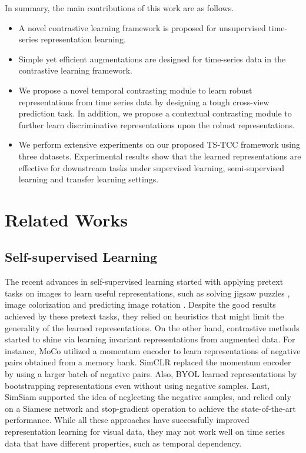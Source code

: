 \documentclass{article}
\begin{document}
In summary, the main contributions of this work are as follows.
\begin{itemize}
    \item A novel contrastive learning framework is proposed for unsupervised time-series representation learning. 
    
     \item Simple yet efficient augmentations are designed for time-series data in the contrastive learning framework. 
    
    \item We propose a novel temporal contrasting module to learn robust representations from time series data by designing a tough cross-view prediction task.  
    In addition, we propose a contextual contrasting module to further learn discriminative representations upon the robust representations.
    
    \item We perform extensive experiments on our proposed TS-TCC framework using three datasets. Experimental results show that the learned representations are effective for downstream tasks under supervised learning, semi-supervised learning and transfer learning settings.

\end{itemize}


\section{Related Works}

\subsection{Self-supervised Learning}
The recent advances in self-supervised learning started with applying pretext tasks on images to learn useful representations, such as solving jigsaw puzzles \cite{puzzle}, image colorization \cite{zhang2016colorful} and predicting image rotation \cite{gidaris:unsupervised}. Despite the good results achieved by these pretext tasks, they relied on heuristics that might limit the generality of the learned representations. On the other hand, contrastive methods started to shine via learning invariant representations from augmented data. For instance, MoCo \cite{He_2020_CVPR} utilized a momentum encoder to learn representations of negative pairs obtained from a memory bank. SimCLR \cite{chen2020simple} replaced the momentum encoder by using a larger batch of negative pairs. Also, BYOL \cite{grill2020bootstrap} learned representations by bootstrapping representations even without using negative samples. Last, SimSiam \cite{simsiam} supported the idea of neglecting the negative samples, and relied only on a Siamese network and stop-gradient operation to achieve the state-of-the-art performance.
While all these approaches have successfully improved representation
learning for visual data, they may not work well on time series data that have different properties, such as temporal dependency. 
\end{document}
